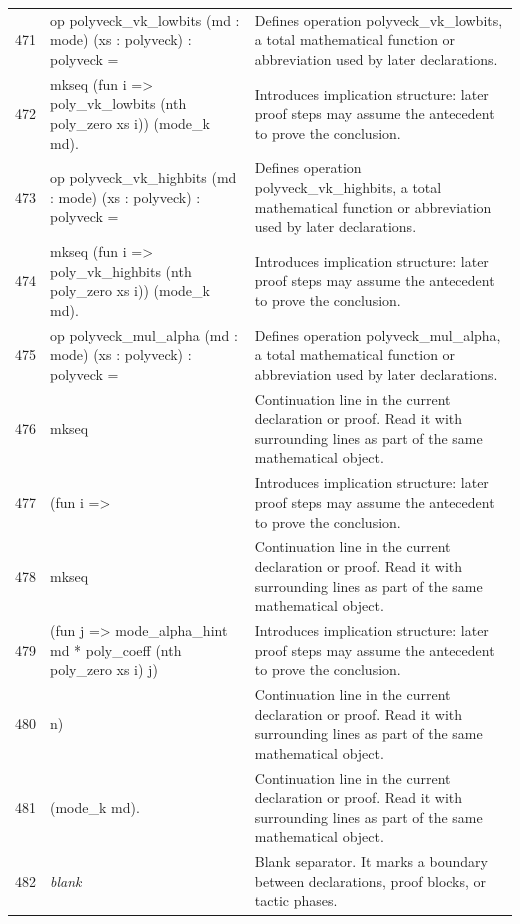 \documentclass[10pt]{article}
\begin{document}
\begin{longtable}{r L{0.53\textwidth} L{0.37\textwidth}}
471 & {\ttfamily\scriptsize op polyveck\_vk\_lowbits (md : mode) (xs : polyveck) : polyveck =} & Defines operation polyveck\_vk\_lowbits, a total mathematical function or abbreviation used by later declarations. \\
472 & {\ttfamily\scriptsize   mkseq (fun i => poly\_vk\_lowbits (nth poly\_zero xs i)) (mode\_k md).} & Introduces implication structure: later proof steps may assume the antecedent to prove the conclusion. \\
473 & {\ttfamily\scriptsize op polyveck\_vk\_highbits (md : mode) (xs : polyveck) : polyveck =} & Defines operation polyveck\_vk\_highbits, a total mathematical function or abbreviation used by later declarations. \\
474 & {\ttfamily\scriptsize   mkseq (fun i => poly\_vk\_highbits (nth poly\_zero xs i)) (mode\_k md).} & Introduces implication structure: later proof steps may assume the antecedent to prove the conclusion. \\
475 & {\ttfamily\scriptsize op polyveck\_mul\_alpha (md : mode) (xs : polyveck) : polyveck =} & Defines operation polyveck\_mul\_alpha, a total mathematical function or abbreviation used by later declarations. \\
476 & {\ttfamily\scriptsize   mkseq} & Continuation line in the current declaration or proof.  Read it with surrounding lines as part of the same mathematical object. \\
477 & {\ttfamily\scriptsize     (fun i =>} & Introduces implication structure: later proof steps may assume the antecedent to prove the conclusion. \\
478 & {\ttfamily\scriptsize       mkseq} & Continuation line in the current declaration or proof.  Read it with surrounding lines as part of the same mathematical object. \\
479 & {\ttfamily\scriptsize         (fun j => mode\_alpha\_hint md * poly\_coeff (nth poly\_zero xs i) j)} & Introduces implication structure: later proof steps may assume the antecedent to prove the conclusion. \\
480 & {\ttfamily\scriptsize         n)} & Continuation line in the current declaration or proof.  Read it with surrounding lines as part of the same mathematical object. \\
481 & {\ttfamily\scriptsize     (mode\_k md).} & Continuation line in the current declaration or proof.  Read it with surrounding lines as part of the same mathematical object. \\
482 & {\ttfamily\scriptsize \emph{blank}} & Blank separator.  It marks a boundary between declarations, proof blocks, or tactic phases. \\

\end{longtable}
\end{document}
